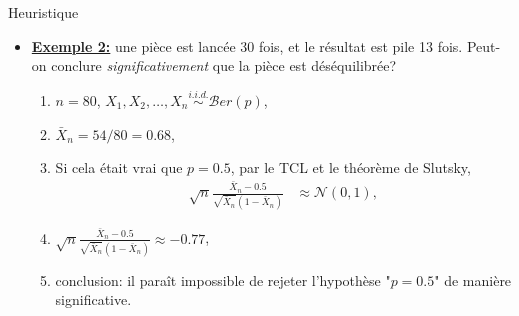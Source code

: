 \begin{frame}[allowframebreaks]{Heuristique}
\begin{itemize}
\begin{enumerate}[-]
        \end{enumerate}
        \framebreak
        \item \textbf{\underline{Exemple 2:}} une pièce est lancée 30 fois, et le résultat est pile 13 fois. 
        Peut-on conclure \emph{significativement} que la pièce est déséquilibrée? \begin{enumerate}[-]
            \item $n = 80$, $X_1, X_2, \ldots, X_n \overset{i.i.d.}{\sim}\mathcal{B}er(p)$,
             \item $\bar{X}_n = 54/80 = 0.68$,
            \item Si cela était vrai que $p = 0.5$, par le TCL et le théorème de Slutsky,\begin{align*}
            \sqrt{n}\frac{\bar{X}_n - 0.5}{\sqrt{\bar{X}_n}(1-\bar{X}_n)} &\approx\mathcal{N}(0, 1),
             \end{align*}
             \item $\sqrt{n}\frac{\bar{X}_n - 0.5}{\sqrt{\bar{X}_n}(1-\bar{X}_n)} \approx -0.77$,
             \item conclusion: il paraît impossible de rejeter l'hypothèse "$p = 0.5$" de manière significative.
            \end{enumerate}
    \end{itemize}
\end{frame}


